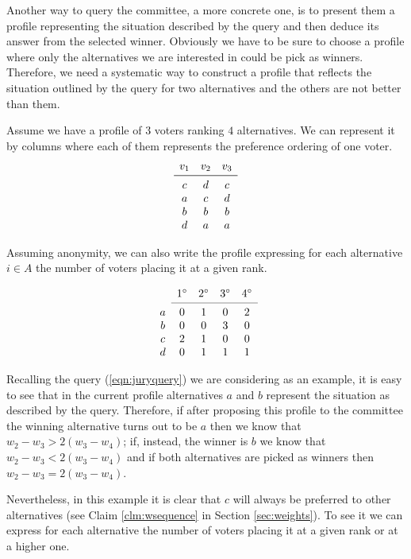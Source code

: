 \documentclass[12pt]{article}
\begin{document}
Another way to query the committee, a more concrete one, is to present them a profile representing the situation described by the query and then deduce its answer from the selected winner. Obviously we have to be sure to choose a profile where only the alternatives we are interested in could be pick as winners. Therefore, we need a systematic way to construct a profile that reflects the situation outlined by the query for two alternatives and the others are not better than them.


Assume we have a profile of $3$ voters ranking $4$ alternatives. We can represent it by columns where each of them represents the preference ordering of one voter.
\[
\begin{array}{ccc}
v_1
& v_2
& v_3 \\
\midrule 
c
& d
& c \\
a
& c
& d \\
b
& b
& b \\
d
& a
& a \\
\end{array}
\]

Assuming anonymity, we can also write the profile expressing for each alternative $i \in A$ the number of voters placing it at a given rank.

\[
\begin{array}{ccccc}
& 1^\circ
& 2^\circ
& 3^\circ
& 4^\circ \\
\cmidrule{2-5}
a 
& 0
& 1
& 0
& 2 \\
b
& 0
& 0
& 3
& 0 \\
c
& 2
& 1
& 0
& 0 \\
d
& 0
& 1
& 1
& 1 \\
\end{array}
\]

Recalling the query (\ref{eqn:juryquery}) we are considering as an example, it is easy to see that in the current profile alternatives $a$ and $b$ represent the situation as described by the query. Therefore, if after proposing this profile to the committee the winning alternative turns out to be $a$ then we know that $w_{2} - w_{3} > 2(w_{3} - w_{4})$; if, instead, the winner is $b$ we know that $w_{2} - w_{3} < 2(w_{3} - w_{4})$ and if both alternatives are picked as winners then $w_{2} - w_{3} = 2(w_{3} - w_{4})$. 

Nevertheless, in this example it is clear that $c$ will always be preferred to other alternatives (see Claim \ref{clm:wsequence} in Section \ref{sec:weights}). To see it we can express for each alternative the number of voters placing it at a given rank or at a higher one.
\end{document}
